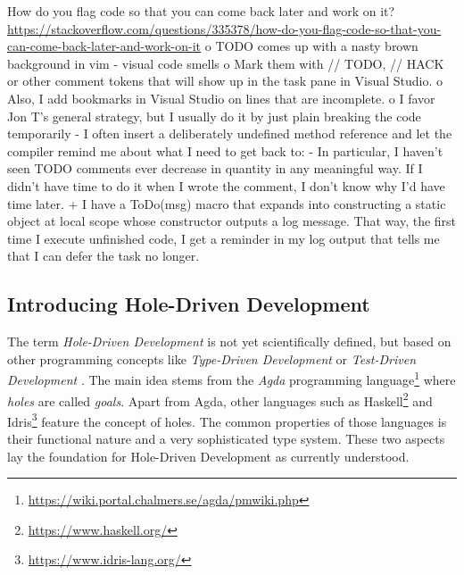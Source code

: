 How do you flag code so that you can come back later and work on it? \url{https://stackoverflow.com/questions/335378/how-do-you-flag-code-so-that-you-can-come-back-later-and-work-on-it}
o TODO comes up with a nasty brown background in vim - visual code smells
o Mark them with // TODO, // HACK or other comment tokens that will show up in the task pane in Visual Studio.
o Also, I add bookmarks in Visual Studio on lines that are incomplete.
o I favor Jon T's general strategy, but I usually do it by just plain breaking the code temporarily - I often insert a deliberately undefined method reference and let the compiler remind me about what I need to get back to:
- In particular, I haven't seen TODO comments ever decrease in quantity in any meaningful way. If I didn't have time to do it when I wrote the comment, I don't know why I'd have time later.
+ I have a ToDo(msg) macro that expands into constructing a static object at local scope whose constructor outputs a log message. That way, the first time I execute unfinished code, I get a reminder in my log output that tells me that I can defer the task no longer.


\subsection{Introducing Hole-Driven Development}
\label{sec:introducing-hole-driven-development}

The term \emph{Hole-Driven Development} is not yet scientifically defined, but based on other programming concepts like \emph{Type-Driven Development} \cite{brady_type-driven_2017} or \emph{Test-Driven Development} \cite{mccracken_digital_1957}.
The main idea stems from the \emph{Agda} programming language\footnote{\url{https://wiki.portal.chalmers.se/agda/pmwiki.php}} where \emph{holes} are called \emph{goals}.
Apart from Agda, other languages such as Haskell\footnote{\url{https://www.haskell.org/}} and Idris\footnote{\url{https://www.idris-lang.org/}} feature the concept of holes.
The common properties of those languages is their functional nature and a very sophisticated type system.
These two aspects lay the foundation for Hole-Driven Development as currently understood.

